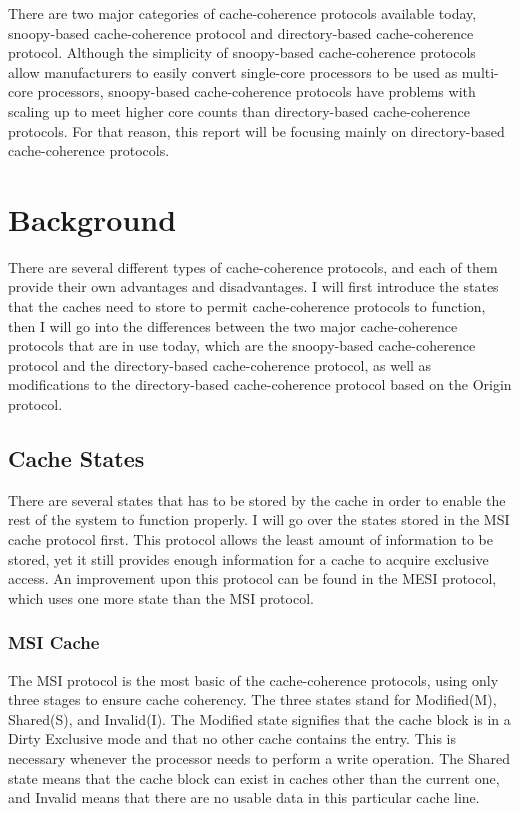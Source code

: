 \documentclass[letterpaper]{article}
\begin{document}
There are two major categories of cache-coherence protocols available today, snoopy-based cache-coherence protocol and directory-based cache-coherence protocol. Although the simplicity of snoopy-based cache-coherence protocols allow manufacturers to easily convert single-core processors to be used as multi-core processors, snoopy-based cache-coherence protocols have problems with scaling up to meet higher core counts than directory-based cache-coherence protocols. For that reason, this report will be focusing mainly on directory-based cache-coherence protocols.

\section[Background]{\rmfamily Background}
{\ttfamily
\textrm{There are several different types of cache-coherence protocols, and each of them provide their own advantages and disadvantages. I will first introduce the states that the caches need to store to permit cache-coherence protocols to function, then I will go into the differences between the two major cache-coherence protocols that are in use today, which are the snoopy-based cache-coherence protocol and the directory-based cache-coherence protocol, as well as modifications to the directory-based cache-coherence protocol based on the Origin protocol.}}

\subsection[Cache States]{\rmfamily Cache States}
There are several states that has to be stored by the cache in order to enable the rest of the system to function properly. I will go over the states stored in the MSI cache protocol first. This protocol allows the least amount of information to be stored, yet it still provides enough information for a cache to acquire exclusive access. An improvement upon this protocol can be found in the MESI protocol, which uses one more state than the MSI protocol.

\subsubsection{MSI Cache}
The MSI protocol is the most basic of the cache-coherence protocols, using only three stages to ensure cache coherency. The three states stand for Modified(M), Shared(S), and Invalid(I). The Modified state signifies that the cache block is in a Dirty Exclusive mode and that no other cache contains the entry. This is necessary whenever the processor needs to perform a write operation. The Shared state means that the cache block can exist in caches other than the current one, and Invalid means that there are no usable data in this particular cache line.
\end{document}
